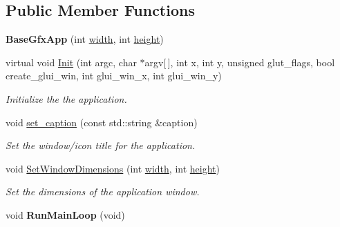 \subsection*{Public Member Functions}
\begin{DoxyCompactItemize}
\item 
{\bfseries Base\+Gfx\+App} (int \hyperlink{classimage__tools_1_1BaseGfxApp_a2fe403c5392f624477c2ce4429f1a7b5}{width}, int \hyperlink{classimage__tools_1_1BaseGfxApp_aa961e13a7a8e6062204223cc33ac7503}{height})\hypertarget{classimage__tools_1_1BaseGfxApp_abdf78453f987997db4f4970b3b873d19}{}\label{classimage__tools_1_1BaseGfxApp_abdf78453f987997db4f4970b3b873d19}

\item 
virtual void \hyperlink{classimage__tools_1_1BaseGfxApp_a7e7e8df01cdbb96d13b7779a1f17622d}{Init} (int argc, char $\ast$argv\mbox{[}$\,$\mbox{]}, int x, int y, unsigned glut\+\_\+flags, bool create\+\_\+glui\+\_\+win, int glui\+\_\+win\+\_\+x, int glui\+\_\+win\+\_\+y)
\begin{DoxyCompactList}\small\item\em Initialize the the application. \end{DoxyCompactList}\item 
void \hyperlink{classimage__tools_1_1BaseGfxApp_a82465649f9a908d341e1db1a2e39bdc8}{set\+\_\+caption} (const std\+::string \&caption)\hypertarget{classimage__tools_1_1BaseGfxApp_a82465649f9a908d341e1db1a2e39bdc8}{}\label{classimage__tools_1_1BaseGfxApp_a82465649f9a908d341e1db1a2e39bdc8}

\begin{DoxyCompactList}\small\item\em Set the window/icon title for the application. \end{DoxyCompactList}\item 
void \hyperlink{classimage__tools_1_1BaseGfxApp_aeaa3a1aef12d88e4ab0665ff841e8d8d}{Set\+Window\+Dimensions} (int \hyperlink{classimage__tools_1_1BaseGfxApp_a2fe403c5392f624477c2ce4429f1a7b5}{width}, int \hyperlink{classimage__tools_1_1BaseGfxApp_aa961e13a7a8e6062204223cc33ac7503}{height})\hypertarget{classimage__tools_1_1BaseGfxApp_aeaa3a1aef12d88e4ab0665ff841e8d8d}{}\label{classimage__tools_1_1BaseGfxApp_aeaa3a1aef12d88e4ab0665ff841e8d8d}

\begin{DoxyCompactList}\small\item\em Set the dimensions of the application window. \end{DoxyCompactList}\item 
void {\bfseries Run\+Main\+Loop} (void)\hypertarget{classimage__tools_1_1BaseGfxApp_a62fae03316774a28455f766ce808a814}{}\label{classimage__tools_1_1BaseGfxApp_a62fae03316774a28455f766ce808a814}


\end{DoxyCompactItemize}
